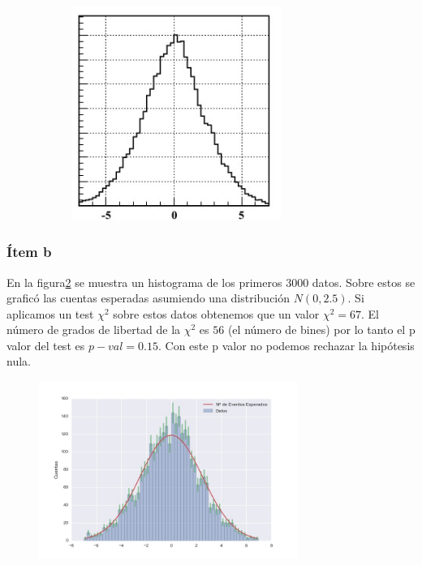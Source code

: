 \begin{figure}
\begin{subfigure}[b]{0.3\textwidth}
\end{subfigure}
\begin{subfigure}[b]{0.3\textwidth}
\includegraphics[width=0.75\textwidth]{hist1.jpg}
\end{subfigure}
\caption[]{}
\label{fig:hists}
\end{figure}

\subsubsection*{Ítem b}
En la figura\ref{fig:fig2} se muestra un histograma de los primeros $3000$ datos.
Sobre estos se graficó las cuentas esperadas asumiendo una distribución $N(0, 2.5)$.
Si aplicamos un test $\chi^2$ sobre estos datos obtenemos que un valor $\chi^2=67$.
El número de grados de libertad de la $\chi^2$ es $56$ (el número de bines) por lo tanto el p valor del test es $p-val=0.15$.
Con este p valor no podemos rechazar la hipótesis nula.

\begin{figure}
\centering
\includegraphics[width=0.75\textwidth]{fig2.jpg}
\caption[]{}
\label{fig:fig2}
\end{figure}

